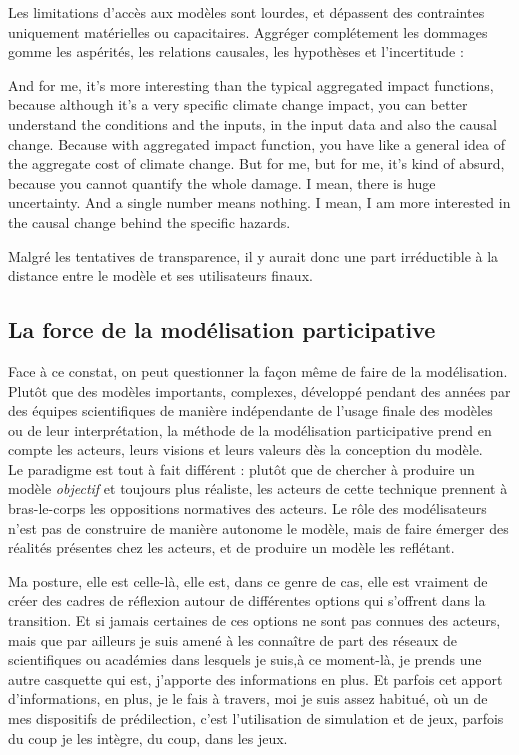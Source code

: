 Les limitations d'accès aux modèles sont lourdes, et dépassent des contraintes uniquement matérielles ou capacitaires. Aggréger complétement les dommages gomme les aspérités, les relations causales, les hypothèses et l'incertitude : 

\begin{authoredquote}
    And for me, it's more interesting than the typical aggregated impact functions, because although it's a very specific climate change impact, you can better understand the conditions and the inputs, in the input data and also the causal change. Because with aggregated impact function, you have like a general idea of the aggregate cost of climate change. But for me, but for me, it's kind of absurd, because you cannot quantify the whole damage. I mean, there is huge uncertainty. And a single number means nothing. I mean, I am more interested in the causal change behind the specific hazards.
\end{authoredquote}


Malgré les tentatives de transparence, il y aurait donc une part irréductible à la distance entre le modèle et ses utilisateurs finaux. 




\subsection{La force de la modélisation participative}

Face à ce constat, on peut questionner la façon même de faire de la modélisation. Plutôt que des modèles importants, complexes, développé pendant des années par des équipes scientifiques de manière indépendante de l'usage finale des modèles ou de leur interprétation, la méthode de la modélisation participative prend en compte les acteurs, leurs visions et leurs valeurs dès la conception du modèle. \\

Le paradigme est tout à fait différent : plutôt que de chercher à produire un modèle \textit{objectif} et toujours plus réaliste, les acteurs de cette technique prennent à bras-le-corps les oppositions normatives des acteurs. Le rôle des modélisateurs n'est pas de construire de manière autonome le modèle, mais de faire émerger des réalités présentes chez les acteurs, et de produire un modèle les reflétant. 

\begin{authoredquote}
    Ma posture, elle est celle-là, elle est, dans ce genre de cas, elle est vraiment de créer des cadres de réflexion autour de différentes options qui s'offrent dans la transition. Et si jamais certaines de ces options ne sont pas connues des acteurs, mais que par ailleurs je suis amené à les connaître de part des réseaux de scientifiques ou académies dans lesquels je suis,à ce moment-là, je prends une autre casquette qui est, j'apporte des informations en plus. Et parfois cet apport d'informations, en plus, je le fais à travers, moi je suis assez habitué, où un de mes dispositifs de prédilection, c'est l'utilisation de simulation et de jeux, parfois du coup je les intègre, du coup, dans les jeux.
\end{authoredquote}

